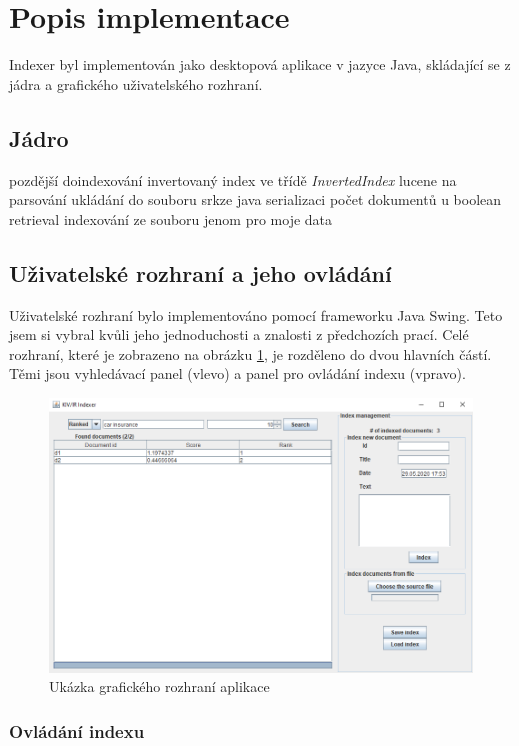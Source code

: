 \documentclass[11pt,a4paper]{scrartcl}
\begin{document}
	\section{Popis implementace}
	Indexer byl implementován jako desktopová aplikace v jazyce Java, skládající se z jádra a grafického uživatelského rozhraní.
	
	\subsection{Jádro}
	
	pozdější doindexování
	invertovaný index ve třídě \textit{InvertedIndex}
	lucene na parsování
	ukládání do souboru srkze java serializaci
	počet dokumentů u boolean retrieval
	indexování ze souboru jenom pro moje data
	
	\subsection{Uživatelské rozhraní a jeho ovládání}
	
	Uživatelské rozhraní bylo implementováno pomocí frameworku Java Swing. Teto jsem si vybral kvůli jeho jednoduchosti a znalosti z předchozích prací. Celé rozhraní, které je zobrazeno na obrázku \ref{fig:gui-example}, je rozděleno do dvou hlavních částí. Těmi jsou vyhledávací panel (vlevo) a panel pro ovládání indexu (vpravo).
	
	\begin{figure}[!h]
		\centering
		\includegraphics[width=0.9\linewidth]{gui-ranked}
		\caption{Ukázka grafického rozhraní aplikace}
		\label{fig:gui-example}
	\end{figure}

	\subsubsection{Ovládání indexu}
	
\end{document}
